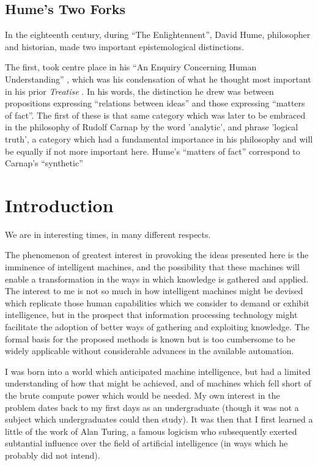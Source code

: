 \documentclass[10pt,titlepage]{book}
\begin{document}
\section{Hume's Two Forks}

In the eighteenth century, during ``The Enlightennent'', David Hume, philosopher and historian, made two important epistemological distinctions.

The first, took centre place in his ``An Enquiry Concerning Human Understanding'' \cite{hume48}, which was his condensation of what he thought most important in his prior \emph{Treatise} \cite{hume39}.
In his words, the distinction he drew was between propositions expressing ``relations between ideas'' and those expressing ``matters of fact''.
The first of these is that same category which was later to be embraced in the philosophy of Rudolf Carnap by the word 'analytic', and phrase 'logical truth', a category which had a fundamental importance in his philosophy and will be equally if not more important here.
Hume's ``matters of fact'' correspond to Carnap's ``synthetic'' 

\chapter{Introduction}

We are in interesting times, in many different respects.

The phenomenon of greatest interest in provoking the ideas presented here is the imminence of intelligent machines, and the possibility that these machines will enable a transformation in the ways in which knowledge is gathered and applied.
The interest to me is not so much in how intelligent machines might be devised which replicate those human capabilities which we consider to demand or exhibit intelligence, but in the prospect that information processing technology might facilitate the adoption of better ways of gathering and exploiting knowledge.
The formal basis for the proposed methods is known but is too cumbersome to be widely applicable without considerable advances in the available automation.

I was born into a world which anticipated machine intelligence, but had a limited understanding of how that might be achieved, and of machines which fell short of the brute compute power which would be needed. 
My own interest in the problem dates back to my first days as an undergraduate (though it was not a subject which undergraduates could then study).
It was then that I first learned a little of the work of Alan Turing, a famous logicism who subsequently exerted subtantial influence over the field of artificial intelligence (in ways which he probably did not intend).
\end{document}
